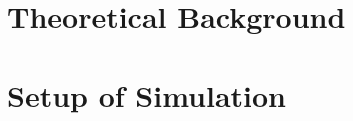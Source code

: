 \documentclass[a4paper,10pt,twoside,ngerman,bibliography=totoc]{scrreprt}
\begin{document}
	\mathswapoff                 %
	\graphicspath{{pics/}}	%
	
	\pagestyle{empty}
	
	\cleardoublepage
	\cleardoublepage
	
	\cleardoublepage
	
	\pagestyle{plain}
	\vspace*{-2cm} 
	\tableofcontents
	\cleardoublepage
	\pagestyle{scrheadings}

	
	\cleardoublepage
	
	
	\cleardoublepage
	\chapter{Theoretical Background}
	
	
	
	\chapter{Setup of Simulation}
	
	
  \clearpage
  \renewcommand{\bibname}{Bibliography}
  \printbibliography
  \cleardoublepage
	\appendix
	
    
\end{document}
